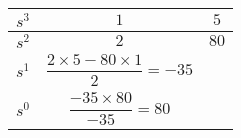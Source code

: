 \begin{tabular}{|c|c|c|}
\hline 
$s^3$ & $ 1 $ & $5$ \\
\hline
$s^2$ &$2$&$80$ \\
\hline
$s^1 $& $\dfrac{2\times 5-80\times1}{2}= 
 -35$ & \\
\hline
$s^0 $& $ \dfrac{-35 \times 80}{-35} = 80$ &\\
\hline
\end{tabular}

